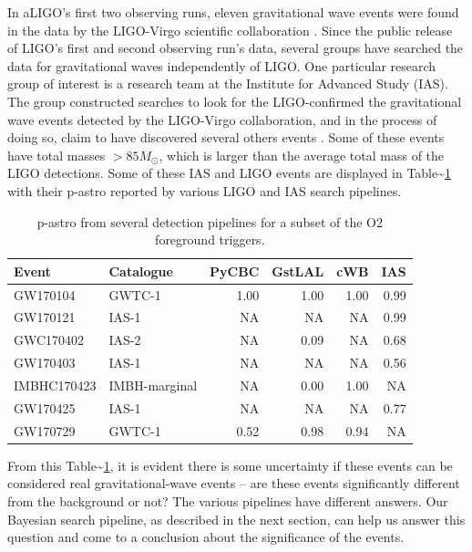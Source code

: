 \documentclass[%
 reprint,
 amsmath,amssymb,
 aps,
]{revtex4}
\begin{document}
In aLIGO's first two observing runs, eleven gravitational wave events were found in the data by the LIGO-Virgo
scientific collaboration \citep{abbott2019gwtc}. Since the public release of LIGO's first and second observing run's data,
several groups have searched the data for gravitational waves independently of LIGO. One particular research group of
interest is a research team at the Institute for Advanced Study (IAS). The group constructed searches to look for the
LIGO-confirmed the gravitational wave events detected by the LIGO-Virgo collaboration, and in the process of doing so,
claim to have discovered several others events \citep{IAS0, IAS1, IAS2}. Some of these events have total masses \(>85 M_{\odot}\), which is larger than the average total mass of the LIGO detections. Some of these IAS and LIGO events are
displayed in Table\textasciitilde\ref{tab:O2significancesWObcr} with their p-astro reported by various LIGO and IAS search pipelines.

\begin{table}[t]

\caption[p-astro for various O2 foreground triggers]{\label{tab:O2significancesWObcr}p-astro from several detection pipelines for a subset of the O2 foreground triggers.}
\centering
\begin{tabular}{llrrrr}
\toprule
Event & Catalogue & PyCBC & GstLAL & cWB & IAS\\
\midrule
GW170104 & GWTC-1 & 1.00 & 1.00 & 1.00 & 0.99\\
GW170121 & IAS-1 & NA & NA & NA & 0.99\\
GWC170402 & IAS-2 & NA & 0.09 & NA & 0.68\\
GW170403 & IAS-1 & NA & NA & NA & 0.56\\
IMBHC170423 & IMBH-marginal & NA & 0.00 & 1.00 & NA\\
GW170425 & IAS-1 & NA & NA & NA & 0.77\\
GW170729 & GWTC-1 & 0.52 & 0.98 & 0.94 & NA\\
\end{tabular}
\end{table}

From this Table\textasciitilde\ref{tab:O2significancesWObcr}, it is evident there is some uncertainty if these events can be considered real
gravitational-wave events -- are these events significantly different from the background or not? The various pipelines
have different answers. Our Bayesian search pipeline, as described in the next section, can help us answer this question
and come to a conclusion about the significance of the events.
\end{document}
